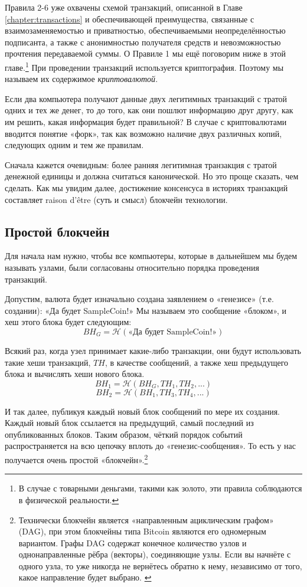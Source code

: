 Правила 2-6 уже охвачены схемой транзакций, описанной в Главе \ref{chapter:transactions} и обеспечивающей преиму\-щества, связанные с взаимозаменяемостью и приватностью, обеспечиваемыми неопределён\-ностью подписанта, а также с анонимностью получателя средств и невозможностью прочте\-ния передаваемой суммы. О Правиле 1 мы ещё поговорим ниже в этой главе.\footnote{В случае с товарными деньгами, такими как золото, эти правила соблюдаются в физической реальности.} При проведении транзакций используется криптография. Поэтому мы называем их содержимое {\em криптовалю\-той}.

Если два компьютера получают данные двух легитимных транзакций с тратой одних и тех же денег, то до того, как они пошлют информацию друг другу, как им решить, какая информация будет правильной? В случае с криптовалютами вводится понятие «форк», так как возможно наличие двух различных копий, следующих одним и тем же правилам.

Сначала кажется очевидным: более ранняя легитимная транзакция с тратой денежной едини\-цы и должна считаться канонической. Но это проще сказать, чем сделать. Как мы увидим далее, достижение консенсуса в историях транзакций составляет raison d'être (суть и смысл) блокчейн технологии.


\subsection{Простой блокчейн}
\label{subsec:simple-blockchain}

Для начала нам нужно, чтобы все компьютеры, которые в дальнейшем мы будем называть узлами, были согласованы относительно порядка проведения транзакций.

Допустим, валюта будет изначально создана заявлением о «генезисе» (т.е. создании): «Да будет SampleCoin!» Мы называем это сообщение «блоком», и хеш этого блока будет следую\-щим: \vspace{.175cm}
\[\mathit{BH}_G = \mathcal{H}(\textrm{«Да будет SampleCoin!»})\]

Всякий раз, когда узел принимает какие-либо транзакции, они будут использовать такие хеши транзакций, $\mathit{TH}$, в качестве сообщений, а также хеш предыдущего блока и вычислять хеши нового блока.\vspace{.175cm}
\[\mathit{BH}_1 = \mathcal{H}(\mathit{BH}_G, \mathit{TH}_1, \mathit{TH}_2,...)\]
\[\mathit{BH}_2 = \mathcal{H}(\mathit{BH}_1, \mathit{TH}_3, \mathit{TH}_4,...)\]

И так далее, публикуя каждый новый блок сообщений по мере их создания. Каждый новый блок ссылается на предыдущий, самый последний из опубликованных блоков. Таким образом, чёткий порядок событий распространяется на всю цепочку вплоть до «генезис-сообщения». То есть у нас получается очень простой «блокчейн».\footnote{Технически блокчейн является «направленным ациклическим графом» (DAG), при этом блокчейны типа Bitcoin являются его одномерным вариантом. Графы DAG содержат конечное количество узлов и однонаправленные рёбра (векторы), соединяющие узлы. Если вы начнёте с одного узла, то уже никогда не вернётесь обратно к нему, независимо от того, какое направление будет выбрано. \cite{DAG-wikipedia}}

